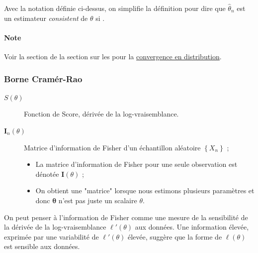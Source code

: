 \documentclass[french]{article}
\begin{document}
\begin{multicols*}{2}
\begin{definitionNOHFILL}
Avec la notation définie ci-dessus, on simplifie la définition pour dire que $\hat{\theta}_{n}$ est un estimateur \og \textit{consistent} \fg{} de $\theta$ si .
\end{definitionNOHFILL}


\paragraph{Note}	Voir la section \textit{\underline{}} de la section sur les \textit{\underline{}} pour la \hyperlink{converge-dist}{convergence en distribution}.


\columnbreak	
\subsubsection{Borne Cramér-Rao} \label{sec:cramer_rao}
\begin{distributions}[Notation]
\begin{description}
	\item[$S(\theta)$]	Fonction de Score, dérivée de la log-vraisemblance.
	\item[$\bm{I}_{n}(\theta)$]	Matrice d'information de Fisher d'un échantillon aléatoire $\left\{X_{n}\right\}$ ;
		\begin{itemize}
		\item	La matrice d'information de Fisher pour une seule observation est dénotée $\bm{I}(\theta)$ ;
		\item	On obtient une "matrice" lorsque nous estimons plusieurs paramètres et donc $\bm{\theta}$ n'est pas juste un scalaire $\theta$.
		\end{itemize}
\end{description}
\end{distributions}

\begin{definitionNOHFILL}
\begin{rappel_enhanced}[Contexte]
On peut penser à l'information de Fisher comme une mesure de la sensibilité de la dérivée de la log-vraisemblance $\ell'(\theta)$ aux données. Une information élevée, exprimée par une variabilité de $\ell'(\theta)$ élevée, suggère que la forme de $\ell(\theta)$ est sensible aux données.
\end{rappel_enhanced}


\end{definitionNOHFILL}
\end{multicols*}
\end{document}
